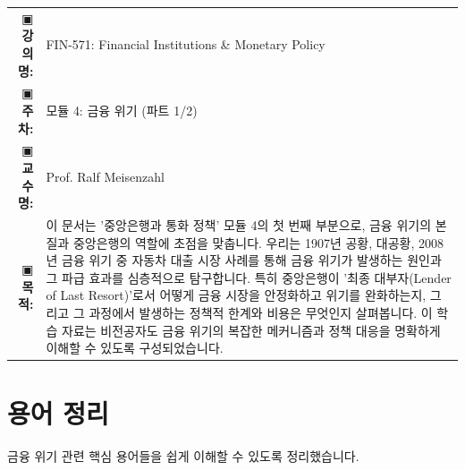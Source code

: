 \documentclass[11pt,a4paper]{article}
\makeatletter
\theoremstyle{definition}
\newcommand{\metainfo}[4]{
\begin{tcolorbox}[
    colback=lightpurple,
    colframe=darkpurple,
    boxrule=1pt,
    arc=2mm,
    left=10pt,
    right=10pt,
    top=8pt,
    bottom=8pt
]
\begin{tabular}{@{}rl@{}}
▣ \textbf{강의명:} & #1 \\[0.3em]
▣ \textbf{주차:} & #2 \\[0.3em]
▣ \textbf{교수명:} & #3 \\[0.3em]
▣ \textbf{목적:} & \begin{minipage}[t]{0.75\textwidth}#4\end{minipage}
\end{tabular}
\end{tcolorbox}
}
\makeatother
\begin{document}
\thispagestyle{firstpage}

\metainfo{FIN-571: Financial Institutions \& Monetary Policy}{모듈 4: 금융 위기 (파트 1/2)}{Prof. Ralf Meisenzahl}{이 문서는 '중앙은행과 통화 정책' 모듈 4의 첫 번째 부분으로, 금융 위기의 본질과 중앙은행의 역할에 초점을 맞춥니다. 우리는 1907년 공황, 대공황, 2008년 금융 위기 중 자동차 대출 시장 사례를 통해 금융 위기가 발생하는 원인과 그 파급 효과를 심층적으로 탐구합니다. 특히 중앙은행이 '최종 대부자(Lender of Last Resort)'로서 어떻게 금융 시장을 안정화하고 위기를 완화하는지, 그리고 그 과정에서 발생하는 정책적 한계와 비용은 무엇인지 살펴봅니다. 이 학습 자료는 비전공자도 금융 위기의 복잡한 메커니즘과 정책 대응을 명확하게 이해할 수 있도록 구성되었습니다.}

\tableofcontents

\newpage

\section{용어 정리}
금융 위기 관련 핵심 용어들을 쉽게 이해할 수 있도록 정리했습니다.
\end{document}
